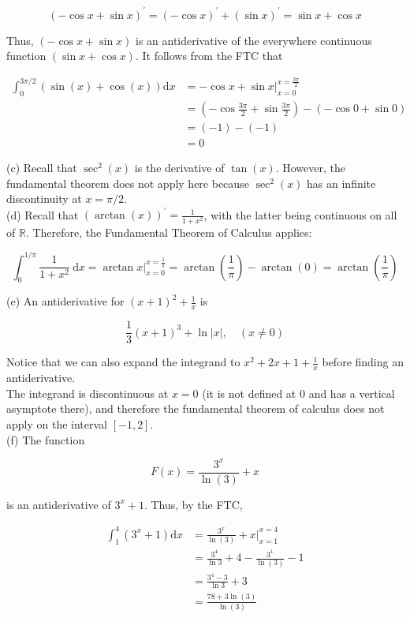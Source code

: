 \documentclass[10pt]{article}
\begin{document}
$$
(-\cos x+\sin x)^{\prime}=(-\cos x)^{\prime}+(\sin x)^{\prime}=\sin x+\cos x
$$

Thus, $(-\cos x+\sin x)$ is an antiderivative of the everywhere continuous function $(\sin x+\cos x)$. It follows from the FTC that

$$
\begin{aligned}
\int_{0}^{3 \pi / 2}(\sin (x)+\cos (x)) \mathrm{d} x & =-\cos x+\left.\sin x\right|_{x=0} ^{x=\frac{3 \pi}{2}} \\
& =\left(-\cos \frac{3 \pi}{2}+\sin \frac{3 \pi}{2}\right)-(-\cos 0+\sin 0) \\
& =(-1)-(-1) \\
& =0
\end{aligned}
$$

(c) Recall that $\sec ^{2}(x)$ is the derivative of $\tan (x)$. However, the fundamental theorem does not apply here because $\sec ^{2}(x)$ has an infinite discontinuity at $x=\pi / 2$.\\
(d) Recall that $(\arctan (x))^{\prime}=\frac{1}{1+x^{2}}$, with the latter being continuous on all of $\mathbb{R}$. Therefore, the Fundamental Theorem of Calculus applies:

$$
\int_{0}^{1 / \pi} \frac{1}{1+x^{2}} \mathrm{~d} x=\left.\arctan x\right|_{x=0} ^{x=\frac{1}{\pi}}=\arctan \left(\frac{1}{\pi}\right)-\arctan (0)=\arctan \left(\frac{1}{\pi}\right)
$$

(e) An antiderivative for $(x+1)^{2}+\frac{1}{x}$ is

$$
\frac{1}{3}(x+1)^{3}+\ln |x|, \quad(x \neq 0)
$$

Notice that we can also expand the integrand to $x^{2}+2 x+1+\frac{1}{x}$ before finding an antiderivative.\\
The integrand is discontinuous at $x=0$ (it is not defined at 0 and has a vertical asymptote there), and therefore the fundamental theorem of calculus does not apply on the interval $[-1,2]$.\\
(f) The function

$$
F(x)=\frac{3^{x}}{\ln (3)}+x
$$

is an antiderivative of $3^{x}+1$. Thus, by the FTC,

$$
\begin{aligned}
\int_{1}^{4}\left(3^{x}+1\right) \mathrm{d} x & =\frac{3^{x}}{\ln (3)}+\left.x\right|_{x=1} ^{x=4} \\
& =\frac{3^{4}}{\ln 3}+4-\frac{3^{1}}{\ln (3)}-1 \\
& =\frac{3^{4}-3}{\ln 3}+3 \\
& =\frac{78+3 \ln (3)}{\ln (3)}
\end{aligned}
$$
\end{document}
